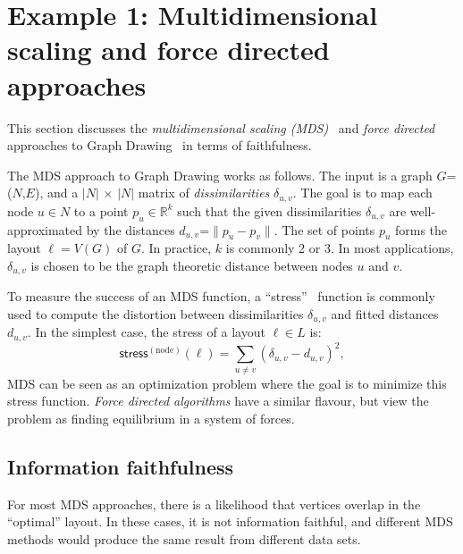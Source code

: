 \documentclass[10pt,journal,cspaper,compsoc]{IEEEtran}
\newcommand{\stress}{\textsf{stress}}
\begin{document}
\section{Example 1: Multidimensional scaling and force directed approaches\label{sec:vizMDS}}

This section discusses the \emph{multidimensional scaling (MDS)}~\cite{brandes2007eigensolver} and \emph{force directed} approaches to Graph Drawing~\cite{eades,fr,finkel,north,hu} in terms of faithfulness.

The MDS approach to Graph Drawing works as follows. The input is a graph $G$=($N$,$E$), and a $|N|$ $\times$ $|N|$ matrix of \emph{dissimilarities} $\delta_{u,v}$. The goal is to map each node $u \in N$ to a point $p_u \in \mathbb{R}^k$  such that the
given dissimilarities $\delta_{u,v}$ are well-approximated by the distances $d_{u,v}$=$\|p_u - p_v\|$. The set of points $p_u$ forms the layout $\ell = V(G)$ of $G$. In practice, $k$ is commonly 2 or 3. In most applications, $\delta_{u,v}$ is chosen to be the graph theoretic distance between nodes $u$ and $v$.

To measure the success of an MDS function, a ``stress''~\cite{kruskal1964multidimensional} function is commonly used to compute the distortion between dissimilarities $\delta_{u,v}$ and fitted distances $d_{u,v}$. In
the simplest case, the stress of a layout $\ell \in L$ is:
\begin{equation}
\label{eq:stress}
\stress^{(\text{node})}(\ell)= \sum_{u\neq v}{ (\delta_{u,v} - d_{u,v} )^2},
\end{equation}
MDS can be seen as an optimization problem where the goal is to minimize this stress function.
\emph{Force directed algorithms} have a similar flavour, but view the problem as finding equilibrium in a system of forces.

\subsection{Information faithfulness}
 For most MDS approaches, there is a likelihood that vertices overlap in the ``optimal'' layout. In these cases, it is not information faithful, and different MDS methods would produce
the same result from different data sets.
\end{document}
